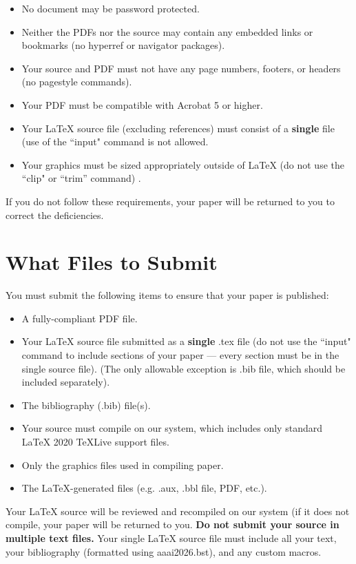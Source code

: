 \documentclass[letterpaper]{article} %
\begin{document}
\begin{itemize}
\item No document may be password protected.
\item Neither the PDFs nor the source may contain any embedded links or bookmarks (no hyperref or navigator packages).
\item Your source and PDF must not have any page numbers, footers, or headers (no pagestyle commands).
\item Your PDF must be compatible with Acrobat 5 or higher.
\item Your \LaTeX{} source file (excluding references) must consist of a \textbf{single} file (use of the ``input" command is not allowed.
\item Your graphics must be sized appropriately outside of \LaTeX{} (do not use the ``clip" or ``trim'' command) .
\end{itemize}

If you do not follow these requirements, your paper will be returned to you to correct the deficiencies.
\fi

\section{What Files to Submit}
You must submit the following items to ensure that your paper is published:
\begin{itemize}
\item A fully-compliant PDF file.
\item Your \LaTeX{} source file submitted as a \textbf{single} .tex file (do not use the ``input" command to include sections of your paper --- every section must be in the single source file). (The only allowable exception is .bib file, which should be included separately).
\item The bibliography (.bib) file(s).
\item Your source must compile on our system, which includes only standard \LaTeX{} 2020 TeXLive support files.
\item Only the graphics files used in compiling paper.
\item The \LaTeX{}-generated files (e.g. .aux,  .bbl file, PDF, etc.).
\end{itemize}

Your \LaTeX{} source will be reviewed and recompiled on our system (if it does not compile, your paper will be returned to you. \textbf{Do not submit your source in multiple text files.} Your single \LaTeX{} source file must include all your text, your bibliography (formatted using aaai2026.bst), and any custom macros.
\end{document}

